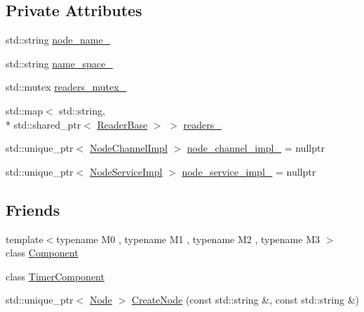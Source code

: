 \subsection*{Private Attributes}
\begin{DoxyCompactItemize}
\item 
std\-::string \hyperlink{classapollo_1_1cyber_1_1Node_afc778da4ec0270b109bdc9dd22b435ad}{node\-\_\-name\-\_\-}
\item 
std\-::string \hyperlink{classapollo_1_1cyber_1_1Node_ad7fbce28b454e6f419cbae9c9e55f665}{name\-\_\-space\-\_\-}
\item 
std\-::mutex \hyperlink{classapollo_1_1cyber_1_1Node_a1da65038b46901c730a9b50a1f0f38d6}{readers\-\_\-mutex\-\_\-}
\item 
std\-::map$<$ std\-::string, \\*
std\-::shared\-\_\-ptr$<$ \hyperlink{classapollo_1_1cyber_1_1ReaderBase}{Reader\-Base} $>$ $>$ \hyperlink{classapollo_1_1cyber_1_1Node_ab62dc14e42c5c1585405690d9af1401b}{readers\-\_\-}
\item 
std\-::unique\-\_\-ptr$<$ \hyperlink{classapollo_1_1cyber_1_1NodeChannelImpl}{Node\-Channel\-Impl} $>$ \hyperlink{classapollo_1_1cyber_1_1Node_aca5b98e6450b2c8f7a399f25e128fc70}{node\-\_\-channel\-\_\-impl\-\_\-} = nullptr
\item 
std\-::unique\-\_\-ptr$<$ \hyperlink{classapollo_1_1cyber_1_1NodeServiceImpl}{Node\-Service\-Impl} $>$ \hyperlink{classapollo_1_1cyber_1_1Node_af99eb9acecc7ee0fc373a94938833579}{node\-\_\-service\-\_\-impl\-\_\-} = nullptr
\end{DoxyCompactItemize}
\subsection*{Friends}
\begin{DoxyCompactItemize}
\item 
{\footnotesize template$<$typename M0 , typename M1 , typename M2 , typename M3 $>$ }\\class \hyperlink{classapollo_1_1cyber_1_1Node_a734c4a9f2abda26d833396f447e6fc27}{Component}
\item 
class \hyperlink{classapollo_1_1cyber_1_1Node_a0a63d0a707df18a6aaaabbb3a39e65cd}{Timer\-Component}
\item 
std\-::unique\-\_\-ptr$<$ \hyperlink{classapollo_1_1cyber_1_1Node}{Node} $>$ \hyperlink{classapollo_1_1cyber_1_1Node_a1ce7fed0a950c53fb2d27a5fc4861b41}{Create\-Node} (const std\-::string \&, const std\-::string \&)
\end{DoxyCompactItemize}


